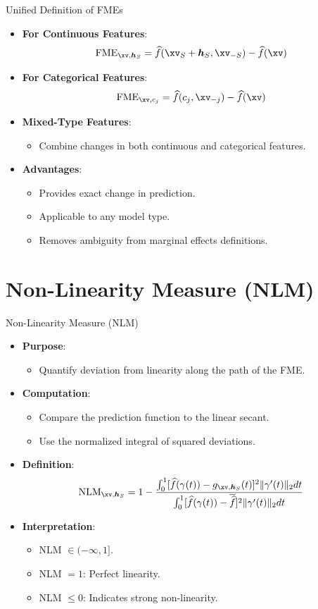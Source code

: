 \documentclass[11pt,compress,t,notes=noshow, aspectratio=169, xcolor=table]{beamer}
\newcommand{\boldhS}{\bm{h}_{S}}
\begin{document}
\begin{frame}{Unified Definition of FMEs}
\begin{itemize}
\item \textbf{For Continuous Features}:
\[
\text{FME}_{\xv, \boldhS} = \widehat{f}(\xv_S + \boldhS, \xv_{-S}) - \widehat{f}(\xv)
\]
\item \textbf{For Categorical Features}:
\[
\text{FME}_{\xv, c_j} = \widehat{f}(c_j, \xv_{-j}) - \widehat{f}(\xv)
\]
\item \textbf{Mixed-Type Features}:
\begin{itemize}
\item Combine changes in both continuous and categorical features.
\end{itemize}
\item \textbf{Advantages}:
\begin{itemize}
\item Provides exact change in prediction.
\item Applicable to any model type.
\item Removes ambiguity from marginal effects definitions.
\end{itemize}
\end{itemize}
\end{frame}

\section{Non-Linearity Measure (NLM)}

\begin{frame}{Non-Linearity Measure (NLM)}
\begin{itemize}
\item \textbf{Purpose}:
\begin{itemize}
  \item Quantify deviation from linearity along the path of the FME.
\end{itemize}
\item \textbf{Computation}:
\begin{itemize}
  \item Compare the prediction function to the linear secant.
  \item Use the normalized integral of squared deviations.
\end{itemize}
\item \textbf{Definition}:
\[
\text{NLM}_{\xv, \boldhS} = 1 - \frac{\int_0^1 [\widehat{f}(\gamma(t)) - g_{\xv, \boldhS}(t)]^2 \Vert \gamma'(t) \Vert_2 dt}{\int_0^1 [\widehat{f}(\gamma(t)) - \overline{\widehat{f}}]^2 \Vert \gamma'(t) \Vert_2 dt}
\]
\item \textbf{Interpretation}:
\begin{itemize}
  \item NLM $\in (-\infty, 1]$.
  \item NLM $=1$: Perfect linearity.
  \item NLM $\leq 0$: Indicates strong non-linearity.
\end{itemize}
\end{itemize}
\end{frame}
\end{document}
